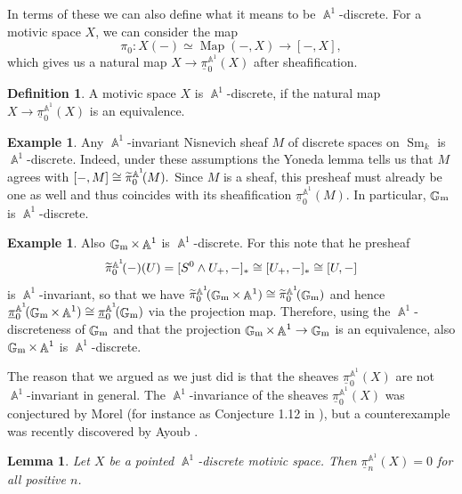 \documentclass[english]{amsart}
\newtheorem{lem}[prop]{Lemma}
\theoremstyle{definition}
\newtheorem{de}[prop]{Definition}
\newtheorem{ex}[prop]{Example}
\DeclareMathOperator{\A}{\mathbb{A}}
\DeclareMathOperator{\G}{\mathbb{G}}
\DeclareMathOperator{\Map}{Map}
\DeclareMathOperator{\Sm}{Sm}
\begin{document}
In terms of these we can also define what it means to be $\A^1$-discrete. For a motivic space $X$, we can consider the map 
$$\pi_0 \colon X(-) \simeq \Map(-,X) \rightarrow [-,X],$$
which gives us a natural map $X \rightarrow \underline{\pi}_0^{\A^1}\!(X)$ after sheafification.
\begin{de}
A motivic space $X$ is $\A^1$-discrete, if the natural map $X \rightarrow \underline{\pi}_0^{\A^1}\!(X)$ is an equivalence. 
\end{de}
\begin{ex}\label{A^1-invariant sheaves are discrete}
Any $\A^1$-invariant Nisnevich sheaf $M$ of discrete spaces on $\Sm_k$ is $\A^1$-discrete. Indeed, under these assumptions the Yoneda lemma tells us that $M$ agrees with $[-,M] \cong \widetilde{\phantom{\pi}}\hspace{-6pt}\pi_0^{\A^1}\!(M).$ Since $M$ is a sheaf, this presheaf must already be one as well and thus coincides with its sheafification $\underline{\pi}_0^{\A^1}\!(M)$. In particular, $\G_{\rm m}$ is $\A^1$-discrete.
\end{ex}
\begin{ex}\label{Gm x A1 is discrete}
Also $\G_{\rm m} \times \A^1$ is $\A^1$-discrete. For this note that he presheaf 
$$\widetilde{\phantom{\pi}}\hspace{-6pt}\pi_0^{\A^1}\!(-)(U) = [S^0 \wedge U_+,-]_* \cong [U_+,-]_* \cong [U,-]$$
is $\A^1$-invariant, so that we have $\widetilde{\phantom{\pi}}\hspace{-6pt}\pi_0^{\A^1}\!(\G_{\rm m} \times \A^1) \cong \widetilde{\phantom{\pi}}\hspace{-6pt}\pi_0^{\A^1}\!(\G_{\rm m})$ and hence $\underline{\pi}_0^{\A^1}\!(\G_{\rm m} \times \A^1) \cong \underline{\pi}_0^{\A^1}\!(\G_{\rm m})$ via the projection map. Therefore, using the $\A^1$-discreteness of $\G_{\rm m}$ and that the projection $\G_{\rm m} \times \A^1 \rightarrow \G_{\rm m}$ is an equivalence, also $\G_{\rm m} \times \A^1$ is $\A^1$-discrete.
\end{ex}
The reason that we argued as we just did is that the sheaves $\underline{\pi}_0^{\A^1}\!(X)$ are not $\A^1$-invariant in general. The $\A^1$-invariance of the sheaves $\underline{\pi}_0^{\A^1}\!(X)$ was conjectured by Morel (for instance as Conjecture 1.12 in \cite{MR2934577}), but a counterexample was recently discovered by Ayoub \cite{Pizero}. 
\begin{lem}\label{Homotopy of Discrete Motivic Spaces}
Let $X$ be a pointed $\A^1$-discrete motivic space. Then $\underline{\pi}^{\A^1}_n\!(X) = 0$ for all positive $n$.
\end{lem}
\end{document}
